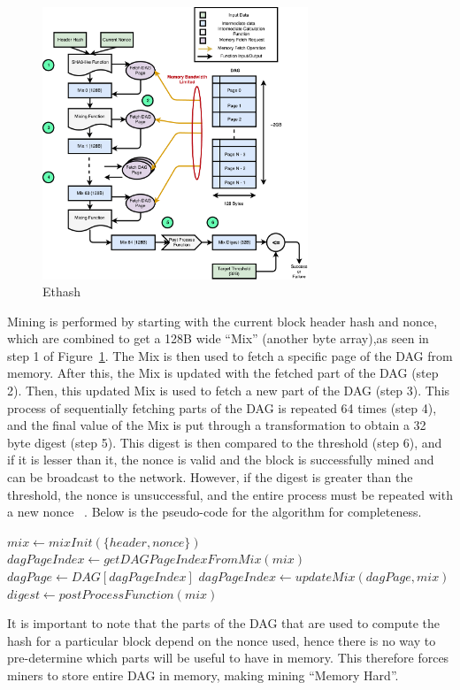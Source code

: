 \documentclass[runningheads]{llncs}
\begin{document}
\begin{figure}[h]
\centering
\includegraphics[width=300px,keepaspectratio]{Ethash.pdf}
\caption{\label{fig:ethash} Ethash}
\end{figure}

Mining is performed by starting with the current block header hash and nonce, which are combined to get a 128B wide ``Mix'' (another byte array),as seen in step 1 of Figure~\ref{fig:ethash}. The Mix is then used to fetch a specific page of the DAG from memory. After this, the Mix is updated with the fetched part of the DAG (step 2). Then, this updated Mix is used to fetch a new part of the DAG (step 3). This process of sequentially fetching parts of the DAG is repeated 64 times (step 4), and the final value of the Mix is put through a transformation to obtain a 32 byte digest (step 5). This digest is then compared to the threshold (step 6), and if it is lesser than it, the nonce is valid and the block is successfully mined and can be broadcast to the network. However, if the digest is greater than the threshold, the nonce is unsuccessful, and the entire process must be repeated with a new nonce ~\cite{Ethmining}. Below is the pseudo-code for the algorithm for completeness.\\
\begin{algorithmic}[H]
\label{miningAlgo}
\STATE $mix \gets mixInit(\{header,nonce\})$
  \STATE $dagPageIndex \gets getDAGPageIndexFromMix(mix)$
  \STATE $dagPage \gets DAG[dagPageIndex]$
  \STATE $dagPageIndex \gets updateMix(dagPage,mix)$
\ENDFOR
\STATE $digest \gets postProcessFunction(mix)$
	\RETURN \TRUE
\ENDIF
\RETURN \FALSE
\end{algorithmic}
It is important to note that the parts of the DAG that are used to compute the hash for a particular block depend on the nonce used, hence there is no way to pre-determine which parts will be useful to have in memory. This therefore forces miners to store entire DAG in memory, making mining ``Memory Hard''. 
\end{document}
